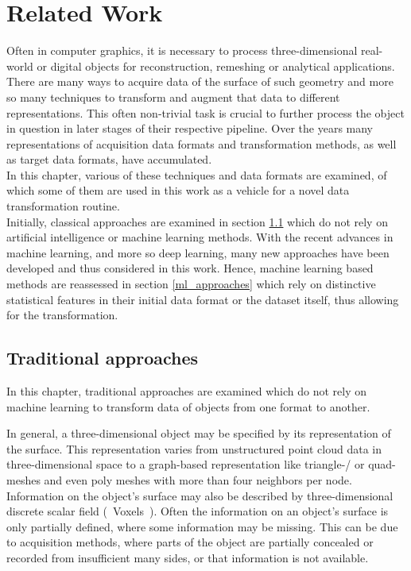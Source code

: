 \chapter{Related Work}
\label{sec:relatedwork}
Often in computer graphics, it is necessary to process three-dimensional real-world or digital objects for reconstruction, remeshing or analytical applications. There are many ways to acquire data of the surface of such geometry and more so many techniques to transform and augment that data to different representations. This often non-trivial task is crucial to further process the object in question in later stages of their respective pipeline. Over the years many representations of acquisition data formats and transformation methods, as well as target data formats, have accumulated.\\
In this chapter, various of these techniques and data formats are examined, of which some of them are used in this work as a vehicle for a novel data transformation routine.\\
Initially, classical approaches are examined in section \ref{classic_approaches} which do not rely on artificial intelligence or machine learning methods.
With the recent advances in machine learning, and more so deep learning, many new approaches have been developed and thus considered in this work.
Hence, machine learning based methods are reassessed in section \ref{ml_approaches} which rely on distinctive statistical features in their initial data format or the dataset itself, thus allowing for the transformation.
\section{Traditional approaches}
\label{classic_approaches}
  In this chapter, traditional approaches are examined which do not rely on machine
  learning to transform data of objects from one format to another. 

  In general, a three-dimensional object may be specified by its representation of the
  surface. This representation varies from unstructured point cloud data in three-dimensional space
  to a graph-based representation like triangle-/ or quad-meshes and even poly meshes
  with more than four neighbors per node. Information on the object's surface may also be described
  by three-dimensional discrete scalar field (~Voxels~).  Often the information on an object's
  surface is only partially defined, where some information may be missing. 
  This can be due to acquisition methods, where parts of the object are partially 
  concealed or recorded from insufficient many sides, or that information is not available.

